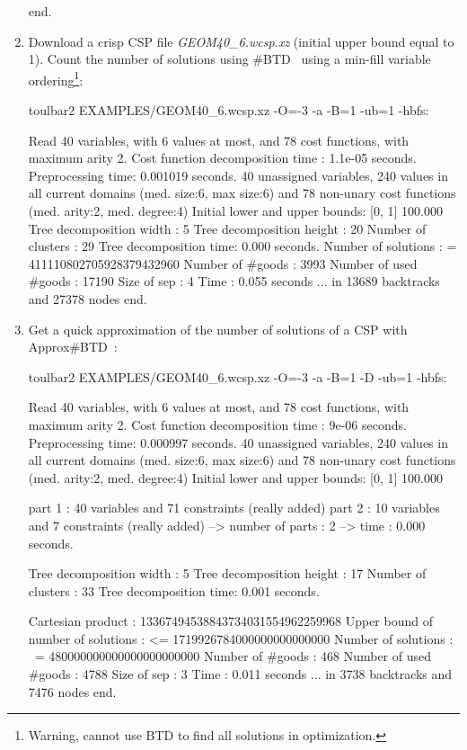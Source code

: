 \begin{enumerate}
{\begin{DoxyCode}
end.
\end{DoxyCode}}
\item Download a crisp CSP file {\em GEOM40\_6.wcsp.xz} (initial upper bound equal to 1). Count the number of solutions using \#BTD~\cite{Favier09a} using a min-fill variable ordering\footnote{Warning, cannot use BTD to find all solutions in optimization.}:
\begin{DoxyCode}
	toulbar2 EXAMPLES/GEOM40_6.wcsp.xz -O=-3 -a -B=1 -ub=1 -hbfs:
\end{DoxyCode}
{\scriptsize
\begin{DoxyCode}
Read 40 variables, with 6 values at most, and 78 cost functions, with maximum arity 2.
Cost function decomposition time : 1.1e-05 seconds.
Preprocessing time: 0.001019 seconds.
40 unassigned variables, 240 values in all current domains (med. size:6, max size:6) and 78 non-unary cost functions (med. arity:2, med. degree:4)
Initial lower and upper bounds: [0, 1] 100.000%
Tree decomposition width  : 5
Tree decomposition height : 20
Number of clusters        : 29
Tree decomposition time: 0.000 seconds.
Number of solutions    : =  411110802705928379432960
Number of #goods       :    3993
Number of used #goods  :    17190
Size of sep            :    4
Time                   :    0.055 seconds
... in 13689 backtracks and 27378 nodes
end.
\end{DoxyCode}}
\item Get a quick approximation of the number of solutions of a CSP with Approx\#BTD~\cite{Favier09a}:
\begin{DoxyCode}
	toulbar2 EXAMPLES/GEOM40_6.wcsp.xz -O=-3 -a -B=1 -D -ub=1 -hbfs:
\end{DoxyCode}
{\scriptsize
\begin{DoxyCode}
Read 40 variables, with 6 values at most, and 78 cost functions, with maximum arity 2.
Cost function decomposition time : 9e-06 seconds.
Preprocessing time: 0.000997 seconds.
40 unassigned variables, 240 values in all current domains (med. size:6, max size:6) and 78 non-unary cost functions (med. arity:2, med. degree:4)
Initial lower and upper bounds: [0, 1] 100.000%

part 1 : 40 variables and 71 constraints (really added)
part 2 : 10 variables and 7 constraints (really added)
--> number of parts : 2
--> time : 0.000 seconds. 

Tree decomposition width  : 5
Tree decomposition height : 17
Number of clusters        : 33
Tree decomposition time: 0.001 seconds.

Cartesian product 		   :    13367494538843734031554962259968
Upper bound of number of solutions : <= 1719926784000000000000000
Number of solutions    : ~= 480000000000000000000000
Number of #goods       :    468
Number of used #goods  :    4788
Size of sep            :    3
Time                   :    0.011 seconds
... in 3738 backtracks and 7476 nodes
end.
\end{DoxyCode}}
\end{enumerate}
